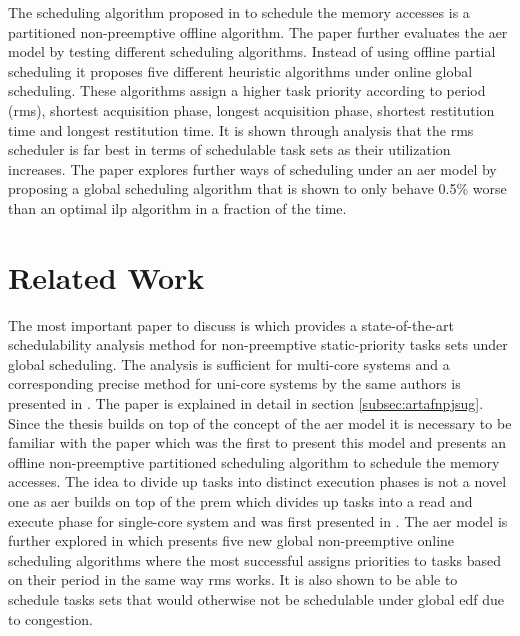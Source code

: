 \documentclass{kththesis}
\begin{document}
The scheduling algorithm proposed in \parencite{durrieu_predictable_2014} to schedule the memory
accesses is a partitioned non-preemptive offline algorithm. The paper \parencite{maia_closer_2016}
further evaluates the \acrshort{aer} model by testing different scheduling algorithms. Instead of
using offline partial scheduling it proposes five different heuristic algorithms under online global
scheduling. These algorithms assign a higher task priority according to period (\acrshort{rms}),
shortest acquisition phase, longest acquisition phase, shortest restitution time and longest
restitution time. It is shown through analysis that the \acrshort{rms} scheduler is far best in
terms of schedulable task sets as their utilization increases. The paper
\parencite{becker_contention-free_2016} explores further ways of scheduling under an \acrshort{aer}
model by proposing a global scheduling algorithm that is shown to only behave 0.5\% worse than an
optimal \acrshort{ilp} algorithm in a fraction of the time.



\section{Related Work} \label{sec:related_work}

The most important paper to discuss is \parencite{nasri_response-time_2018} which provides a
state-of-the-art schedulability analysis method for non-preemptive static-priority tasks sets under global
scheduling. The analysis is sufficient for multi-core systems and a corresponding precise method for
uni-core systems by the same authors is presented in \parencite{nasri_exact_2017}. The paper is
explained in detail in section \ref{subsec:artafnpjsug}. Since the thesis builds on top of the
concept of the \acrshort{aer} model it is necessary to be familiar with the paper
\parencite{durrieu_predictable_2014} which was the first to present this model and presents an
offline non-preemptive partitioned scheduling algorithm to schedule the memory accesses. The idea to divide
up tasks into distinct execution phases is not a novel one as \acrshort{aer} builds on top of the
\acrshort{prem} which divides up tasks into a read and execute phase for single-core system and was
first presented in \parencite{pellizzoni_predictable_2011}. The \acrshort{aer} model is
further explored in \parencite{maia_closer_2016} which presents five new global non-preemptive
online scheduling algorithms where the most successful assigns priorities to tasks based on their
period in the same way \acrshort{rms} works. It is also shown to be able to schedule tasks sets that
would otherwise not be schedulable under global \acrshort{edf} due to congestion.
\end{document}
